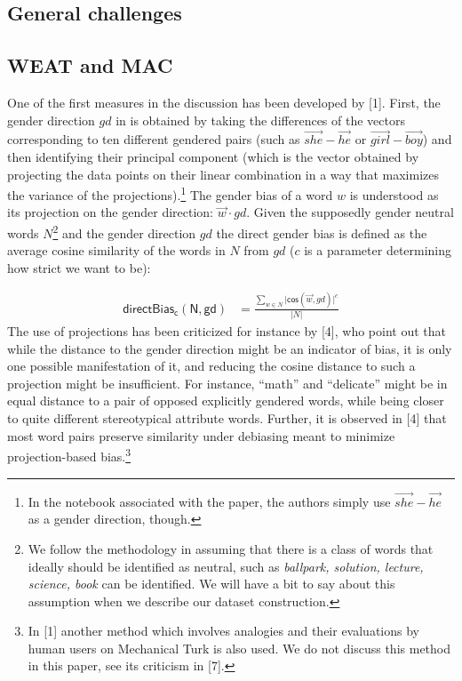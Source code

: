 \documentclass[
  10pt,
  dvipsnames,enabledeprecatedfontcommands, twocolumn]{scrartcl}
\begin{document}
\hypertarget{general-challenges}{%
\subsection{General challenges}\label{general-challenges}}

\hypertarget{weat-and-mac}{%
\subsection{WEAT and MAC}\label{weat-and-mac}}

One of the first measures in the discussion has been developed by
{[}1{]}. First, the gender direction \(gd\) in is obtained by taking the
differences of the vectors corresponding to ten different gendered pairs
(such as \(\overrightarrow{she} - \overrightarrow{he}\) or
\(\overrightarrow{girl} - \overrightarrow{boy}\)) and then identifying
their principal component (which is the vector obtained by projecting
the data points on their linear combination in a way that maximizes the
variance of the projections).\footnote{In the notebook associated with
  the paper, the authors simply use
  \(\overrightarrow{she} - \overrightarrow{he}\) as a gender direction,
  though.} The gender bias of a word \(w\) is understood as its
projection on the gender direction: \(\vec{w} \cdot gd\). Given the
supposedly gender neutral words \(N\)\footnote{We follow the methodology
  in assuming that there is a class of words that ideally should be
  identified as neutral, such as
  \emph{ballpark, solution, lecture, science, book} can be identified.
  We will have a bit to say about this assumption when we describe our
  dataset construction.}  and the gender
direction \(gd\) the direct gender bias is defined as the average cosine
similarity of the words in \(N\) from \(gd\) (\(c\) is a parameter
determining how strict we want to be):

\footnotesize

\begin{align}
\mathsf{directBias_c(N,gd)} & = \frac{\sum_{w\in N}\vert \mathsf{cos}(\vec{w},gd)\vert^c}{\vert N \vert }
\end{align} \normalsize  The use of projections has been criticized for
instance by {[}4{]}, who point out that while the distance to the gender
direction might be an indicator of bias, it is only one possible
manifestation of it, and reducing the cosine distance to such a
projection might be insufficient. For instance, ``math'' and
``delicate'' might be in equal distance to a pair of opposed explicitly
gendered words, while being closer to quite different stereotypical
attribute words. Further, it is observed in {[}4{]} that most word pairs
preserve similarity under debiasing meant to minimize projection-based
bias.\footnote{In {[}1{]} another method which involves analogies and
  their evaluations by human users on Mechanical Turk is also used. We
  do not discuss this method in this paper, see its criticism in
  {[}7{]}.}
\end{document}
